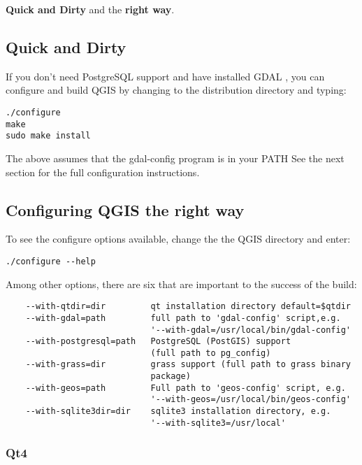 \textbf{Quick and Dirty} and the \textbf{right way}.
  
\subsection{Quick and Dirty}
  
If you don't need PostgreSQL support and have installed GDAL ,
you can configure and build QGIS by changing to the distribution
directory and typing:
  
\begin{verbatim}
./configure
make
sudo make install
\end{verbatim}

The above assumes that the gdal-config program is in your PATH
See the next section for the full configuration instructions.
  
\subsection{Configuring QGIS the right way}
  
To see the configure options available, change the the QGIS directory and
enter:

\begin{verbatim}
./configure --help
\end{verbatim}
  
Among other options, there are six that are important to the success of
the build:

\begin{verbatim}
    --with-qtdir=dir         qt installation directory default=$qtdir
    --with-gdal=path         full path to 'gdal-config' script,e.g.
                             '--with-gdal=/usr/local/bin/gdal-config'
    --with-postgresql=path   PostgreSQL (PostGIS) support
                             (full path to pg_config)
    --with-grass=dir         grass support (full path to grass binary 
                             package)
    --with-geos=path         Full path to 'geos-config' script, e.g.
                             '--with-geos=/usr/local/bin/geos-config'
    --with-sqlite3dir=dir    sqlite3 installation directory, e.g.
                             '--with-sqlite3=/usr/local'
\end{verbatim}

\subsubsection{Qt4}
  
